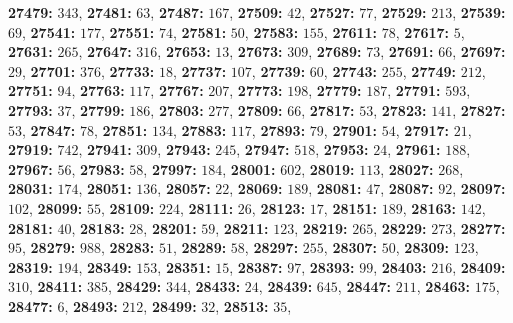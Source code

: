 \textsf{\bfseries 27479:} $343$, \textsf{\bfseries 27481:} $63$, \textsf{\bfseries 27487:} $167$, \textsf{\bfseries 27509:} $42$, \textsf{\bfseries 27527:} $77$, \textsf{\bfseries 27529:} $213$, \textsf{\bfseries 27539:} $69$, \textsf{\bfseries 27541:} $177$, \textsf{\bfseries 27551:} $74$, \textsf{\bfseries 27581:} $50$, \textsf{\bfseries 27583:} $155$, \textsf{\bfseries 27611:} $78$, \textsf{\bfseries 27617:} $5$, \textsf{\bfseries 27631:} $265$, \textsf{\bfseries 27647:} $316$, \textsf{\bfseries 27653:} $13$, \textsf{\bfseries 27673:} $309$, \textsf{\bfseries 27689:} $73$, \textsf{\bfseries 27691:} $66$, \textsf{\bfseries 27697:} $29$, \textsf{\bfseries 27701:} $376$, \textsf{\bfseries 27733:} $18$, \textsf{\bfseries 27737:} $107$, \textsf{\bfseries 27739:} $60$, \textsf{\bfseries 27743:} $255$, \textsf{\bfseries 27749:} $212$, \textsf{\bfseries 27751:} $94$, \textsf{\bfseries 27763:} $117$, \textsf{\bfseries 27767:} $207$, \textsf{\bfseries 27773:} $198$, \textsf{\bfseries 27779:} $187$, \textsf{\bfseries 27791:} $593$, \textsf{\bfseries 27793:} $37$, \textsf{\bfseries 27799:} $186$, \textsf{\bfseries 27803:} $277$, \textsf{\bfseries 27809:} $66$, \textsf{\bfseries 27817:} $53$, \textsf{\bfseries 27823:} $141$, \textsf{\bfseries 27827:} $53$, \textsf{\bfseries 27847:} $78$, \textsf{\bfseries 27851:} $134$, \textsf{\bfseries 27883:} $117$, \textsf{\bfseries 27893:} $79$, \textsf{\bfseries 27901:} $54$, \textsf{\bfseries 27917:} $21$, \textsf{\bfseries 27919:} $742$, \textsf{\bfseries 27941:} $309$, \textsf{\bfseries 27943:} $245$, \textsf{\bfseries 27947:} $518$, \textsf{\bfseries 27953:} $24$, \textsf{\bfseries 27961:} $188$, \textsf{\bfseries 27967:} $56$, \textsf{\bfseries 27983:} $58$, \textsf{\bfseries 27997:} $184$, \textsf{\bfseries 28001:} $602$, \textsf{\bfseries 28019:} $113$, \textsf{\bfseries 28027:} $268$, \textsf{\bfseries 28031:} $174$, \textsf{\bfseries 28051:} $136$, \textsf{\bfseries 28057:} $22$, \textsf{\bfseries 28069:} $189$, \textsf{\bfseries 28081:} $47$, \textsf{\bfseries 28087:} $92$, \textsf{\bfseries 28097:} $102$, \textsf{\bfseries 28099:} $55$, \textsf{\bfseries 28109:} $224$, \textsf{\bfseries 28111:} $26$, \textsf{\bfseries 28123:} $17$, \textsf{\bfseries 28151:} $189$, \textsf{\bfseries 28163:} $142$, \textsf{\bfseries 28181:} $40$, \textsf{\bfseries 28183:} $28$, \textsf{\bfseries 28201:} $59$, \textsf{\bfseries 28211:} $123$, \textsf{\bfseries 28219:} $265$, \textsf{\bfseries 28229:} $273$, \textsf{\bfseries 28277:} $95$, \textsf{\bfseries 28279:} $988$, \textsf{\bfseries 28283:} $51$, \textsf{\bfseries 28289:} $58$, \textsf{\bfseries 28297:} $255$, \textsf{\bfseries 28307:} $50$, \textsf{\bfseries 28309:} $123$, \textsf{\bfseries 28319:} $194$, \textsf{\bfseries 28349:} $153$, \textsf{\bfseries 28351:} $15$, \textsf{\bfseries 28387:} $97$, \textsf{\bfseries 28393:} $99$, \textsf{\bfseries 28403:} $216$, \textsf{\bfseries 28409:} $310$, \textsf{\bfseries 28411:} $385$, \textsf{\bfseries 28429:} $344$, \textsf{\bfseries 28433:} $24$, \textsf{\bfseries 28439:} $645$, \textsf{\bfseries 28447:} $211$, \textsf{\bfseries 28463:} $175$, \textsf{\bfseries 28477:} $6$, \textsf{\bfseries 28493:} $212$, \textsf{\bfseries 28499:} $32$, \textsf{\bfseries 28513:} $35$, 
